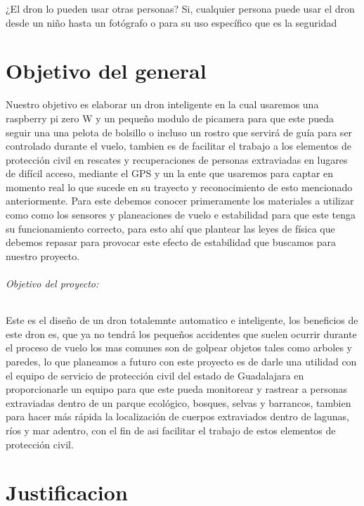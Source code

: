 \documentclass[11pt,a4paper]{article}
\begin{document}
¿El dron lo pueden usar otras personas?
Si, cualquier persona puede usar el dron desde un niño hasta un fotógrafo o para su uso específico que es la seguridad

\part{Objetivo del general}
Nuestro objetivo es elaborar un dron inteligente en la cual usaremos una raspberry pi zero W y un pequeño modulo de picamera para que este pueda seguir una una pelota de bolsillo o incluso un rostro que servirá de guía para ser controlado durante el vuelo, tambien es de facilitar el trabajo a los elementos de protección civil en rescates y recuperaciones de personas extraviadas en lugares de difícil acceso, mediante el GPS y un la ente que usaremos para captar en momento real lo que sucede en su trayecto y reconocimiento de esto mencionado anteriormente. Para este debemos conocer primeramente los materiales a utilizar como como los sensores y planeaciones de vuelo e estabilidad para que este tenga su funcionamiento correcto, para esto ahí que plantear las leyes de física que debemos repasar para provocar este efecto de estabilidad que buscamos para nuestro proyecto.  

\paragraph{Objetivo del proyecto:}


Este es el diseño de un dron totalemnte automatico e inteligente, los beneficios de este dron es, que ya no tendrá los pequeños accidentes que suelen ocurrir durante el proceso de vuelo los mas comunes son de golpear objetos tales como arboles y paredes, lo que planeamos a futuro con este proyecto es de darle una utilidad con el equipo de servicio de protección civil del estado de Guadalajara en proporcionarle un equipo para que este pueda monitorear y rastrear a personas extraviadas dentro de un parque ecológico, bosques, selvas y barrancos, tambien para hacer más rápida la localización de cuerpos extraviados dentro de lagunas, ríos y mar adentro, con el fin de asi facilitar el trabajo de estos elementos de protección civil.

\part{Justificacion}
\end{document}
